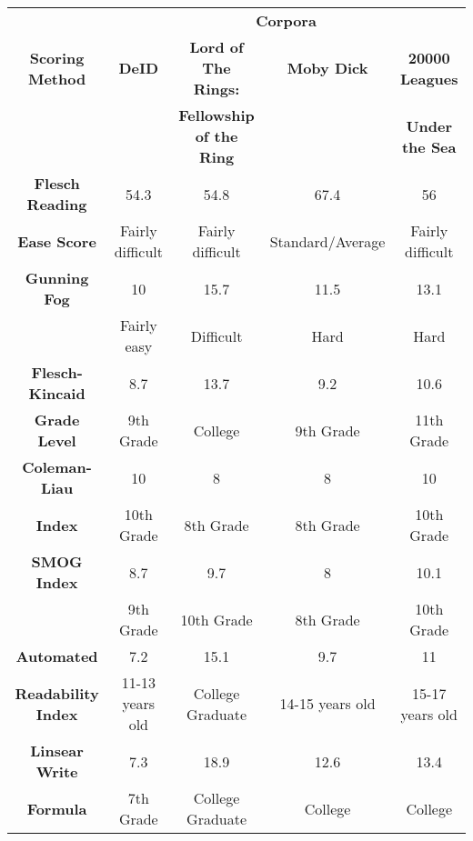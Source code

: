 \begin{center}
\begin{tabular}{|c|c|c|c|c|}
    \hline
    & \multicolumn{4}{|c|}{\textbf{Corpora}} \\
    \cline{2-5}
    \textbf{Scoring Method} & \textbf{DeID} & \textbf{Lord of The Rings: } & \textbf{Moby Dick} & \textbf{20000 Leagues }\\
     & & \textbf{Fellowship of the Ring} & & \textbf{Under the Sea}\\
    \hline
    \textbf{Flesch Reading} & 54.3 & 54.8 & 67.4 & 56 \\
    \textbf{Ease Score} & Fairly difficult & Fairly difficult & Standard/Average & Fairly difficult \\
    \hline
    \textbf{Gunning Fog} & 10 & 15.7 & 11.5 & 13.1\\
    & Fairly easy & Difficult & Hard & Hard \\
    \hline
    \textbf{Flesch-Kincaid} & 8.7 & 13.7 & 9.2 & 10.6\\
    \textbf{Grade Level} & 9th Grade & College & 9th Grade & 11th Grade\\
    \hline
    \textbf{Coleman-Liau} & 10 & 8 & 8 & 10\\
    \textbf{Index} & 10th Grade & 8th Grade & 8th Grade & 10th Grade \\
    \hline
    \textbf{SMOG Index} & 8.7 & 9.7 & 8 & 10.1\\
    & 9th Grade & 10th Grade & 8th Grade & 10th Grade\\
    \hline
    \textbf{Automated} & 7.2 & 15.1 & 9.7 & 11\\
    \textbf{Readability Index} & 11-13 years old & College Graduate & 14-15 years old & 15-17 years old \\
    \hline
    \textbf{Linsear Write} & 7.3 & 18.9 & 12.6 & 13.4\\
    \textbf{Formula} & 7th Grade & College Graduate & College & College \\
    \hline
\end{tabular}
\end{center}

